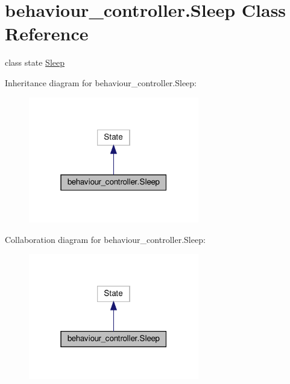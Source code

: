 \hypertarget{classbehaviour__controller_1_1Sleep}{}\section{behaviour\+\_\+controller.\+Sleep Class Reference}
\label{classbehaviour__controller_1_1Sleep}


class state \hyperlink{classbehaviour__controller_1_1Sleep}{Sleep}  




Inheritance diagram for behaviour\+\_\+controller.\+Sleep\+:\nopagebreak
\begin{figure}[H]
\begin{center}
\leavevmode
\includegraphics[width=211pt]{classbehaviour__controller_1_1Sleep__inherit__graph}
\end{center}
\end{figure}


Collaboration diagram for behaviour\+\_\+controller.\+Sleep\+:\nopagebreak
\begin{figure}[H]
\begin{center}
\leavevmode
\includegraphics[width=211pt]{classbehaviour__controller_1_1Sleep__coll__graph}
\end{center}
\end{figure}
